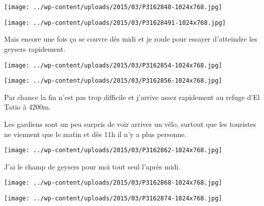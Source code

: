  

\begin{center} \texttt{[image: ../wp-content/uploads/2015/03/P3162848-1024x768.jpg]} \end{center}



 

\begin{center} \texttt{[image: ../wp-content/uploads/2015/03/P31628491-1024x768.jpg]} \end{center}

Mais encore une fois ça se couvre dès midi et je roule pour essayer d'atteindre les geysers rapidement. 

 

\begin{center} \texttt{[image: ../wp-content/uploads/2015/03/P3162854-1024x768.jpg]} \end{center}



 

\begin{center} \texttt{[image: ../wp-content/uploads/2015/03/P3162856-1024x768.jpg]} \end{center}

 

 Par chance la fin n'est pas trop difficile et j'arrive assez rapidement au refuge d'El Tatio à 4200m. 

 Les gardiens sont un peu surpris de voir arriver un vélo, surtout que les touristes ne viennent que le matin et dès 11h il n'y a plus personne. 

 

\begin{center} \texttt{[image: ../wp-content/uploads/2015/03/P3162862-1024x768.jpg]} \end{center}

 

 J'ai le champ de geysers pour moi tout seul l'après midi. 

 

\begin{center} \texttt{[image: ../wp-content/uploads/2015/03/P3162868-1024x768.jpg]} \end{center}



 

\begin{center} \texttt{[image: ../wp-content/uploads/2015/03/P3162874-1024x768.jpg]} \end{center}



